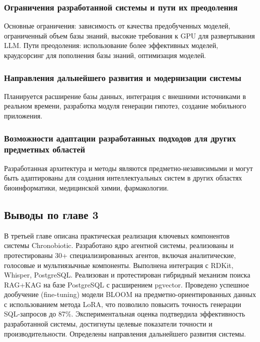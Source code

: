 \documentclass[a4paper,14pt]{extarticle}
\begin{document}
	\subsubsection{Ограничения разработанной системы и пути их преодоления}
	Основные ограничения: зависимость от качества предобученных моделей, ограниченный объем базы знаний, высокие требования к GPU для развертывания LLM. Пути преодоления: использование более эффективных моделей, краудсорсинг для пополнения базы знаний, оптимизация моделей.
	
	\subsubsection{Направления дальнейшего развития и модернизации системы}
	Планируется расширение базы данных, интеграция с внешними источниками в реальном времени, разработка модуля генерации гипотез, создание мобильного приложения.
	
	\subsubsection{Возможности адаптации разработанных подходов для других предметных областей}
	Разработанная архитектура и методы являются предметно-независимыми и могут быть адаптированы для создания интеллектуальных систем в других областях биоинформатики, медицинской химии, фармакологии.
	
	\subsection*{Выводы по главе 3}
	
	В третьей главе описана практическая реализация ключевых компонентов системы Chronobiotic. Разработано ядро агентной системы, реализованы и протестированы 30+ специализированных агентов, включая аналитические, голосовые и мультиязычные компоненты. Выполнена интеграция с RDKit, Whisper, PostgreSQL. Реализован и протестирован гибридный механизм поиска RAG+KAG на базе PostgreSQL с расширением pgvector. Проведено успешное дообучение (fine-tuning) модели BLOOM на предметно-ориентированных данных с использованием метода LoRA, что позволило повысить точность генерации SQL-запросов до 87\%. Экспериментальная оценка подтвердила эффективность разработанной системы, достигнуты целевые показатели точности и производительности. Определены направления дальнейшего развития системы.
	
	\newpage
	
\end{document}

